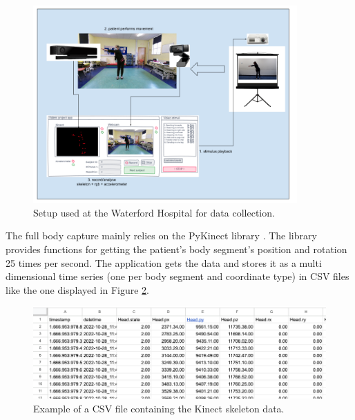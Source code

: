                     \begin{figure}[H]
                        \centering
                        \includegraphics[width=0.9\textwidth]{./resources/images/kinect/setup.png}
                        \caption{Setup used at the Waterford Hospital for data collection.}
                        \label{fig:kinect_setup}
                    \end{figure}
                    

                    The full body capture mainly relies on the PyKinect library \cite{GitHubKinectPyKinect2}.
                    The library provides functions for getting the patient's body segment's position and rotation 25 times per second. The application gets the data and stores it as a multi dimensional time series (one per body segment and coordinate type) in CSV files like the one displayed in Figure \ref{fig:csv_structure}.
                    \newpage
                    \begin{figure}[H]
                        \centering
                        \includegraphics[width=1.0\textwidth]{./resources/images/other/data.png}
                        \caption{Example of a CSV file containing the Kinect skeleton data.}
                        \label{fig:csv_structure}
                    \end{figure}

